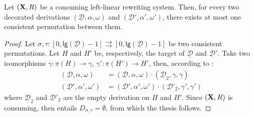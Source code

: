 \documentclass[a4paper,UKenglish,cleveref,pdftex,thm-restate,numberwithinsect]{lipics-v2021}
\def\R{\mathsf{R}}
\def\X{\textbf {\textup{X}}}
\newcommand{\dder}[1]{\mathscr{#1}}
\newcommand{\der}[1]{\underline{\dder{#1}}}
\newcommand{\lgh}[0]{\mathsf{lg}}
\begin{document}
\begin{corollary}\label{cor:unique}
  Let $(\X,\R)$ be a consuming left-linear rewriting system. Then,
  for every two decorated derivations $(\der{D}, \alpha, \omega)$ and
  $(\der{D}', \alpha', \omega')$, there exists at most one consistent
  permutation between them.
\end{corollary}
\begin{proof}
  Let
  $\sigma, \tau: [0, \lgh(\der{D})-1]\rightrightarrows [0,
  \lgh(\der{D})-1]$ be two consistent permutations. Let $H$ and $H'$
  be, respectively, the target of $\der{D}$ and $\der{D}'$. Take two
  isomorphisms $\gamma:\pi(H)\to \gamma$, $\gamma':\pi(H')\to H'$,
  then, according to :
  \begin{align*}(\der{D}, \alpha, \omega) & =(\der{D}, \alpha,
    \omega)\cdot (\der{D}_2, \gamma, \gamma) \\(\der{D}', \alpha',
    \omega')&=(\der{D}', \alpha', \omega')\cdot (\der{D}'_2, \gamma',
    \gamma')
  \end{align*}
  where $\der{D}_2$ and $\der{D}'_2$ are the empty derivation on $H$
  and $H'$. Since $(\X, \R)$ is consuming, then 
  entails $D_{\sigma, \tau}=\emptyset$, from which the thesis follows.
\end{proof}
\end{document}
